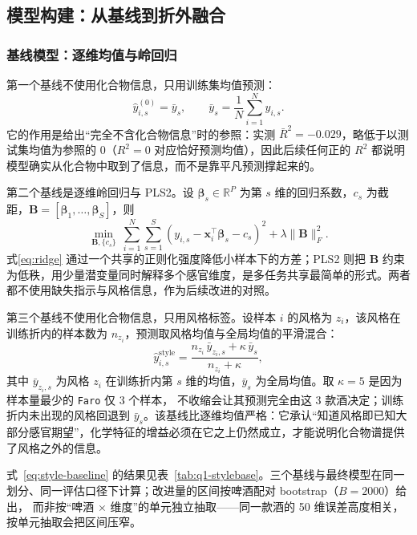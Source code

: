 ﻿\documentclass[UTF8,a4paper,zihao=-4]{ctexart}
\numberwithin{figure}{section}
\numberwithin{table}{section}
\numberwithin{equation}{section}
\newcommand{\file}[1]{\texttt{#1}}
\newcommand{\R}{\mathbb{R}}
\newcommand{\vx}{\bm{x}}
\newcommand{\bB}{\bm{B}}
\newcommand{\bbeta}{\bm{\beta}}
\begin{document}
\subsection{模型构建：从基线到折外融合}

\subsubsection{基线模型：逐维均值与岭回归}

第一个基线不使用化合物信息，只用训练集均值预测：
\begin{equation}
\hat y^{(0)}_{i,s}=\bar y_s,\qquad \bar y_s=\frac{1}{N}\sum_{i=1}^{N}y_{i,s}.
\label{eq:mean-baseline}
\end{equation}
它的作用是给出“完全不含化合物信息”时的参照：实测 $\bar R^2=-0.029$，略低于以测试集均值为参照的 0（$R^2=0$ 对应恰好预测均值），因此后续任何正的 $R^2$ 都说明模型确实从化合物中取到了信息，而不是靠平凡预测撑起来的。

第二个基线是逐维岭回归与 PLS2\cite{hastie2009,wold2001}。设 $\bbeta_s\in\R^{P}$ 为第 $s$ 维的回归系数，$c_s$ 为截距，$\bB=[\bbeta_1,\dots,\bbeta_S]$，则
\begin{equation}
\min_{\bB,\{c_s\}}\ \sum_{i=1}^{N}\sum_{s=1}^{S}\left(y_{i,s}-\vx_i^{\top}\bbeta_s-c_s\right)^2+\lambda\|\bB\|_F^2 .
\label{eq:ridge}
\end{equation}
式\eqref{eq:ridge} 通过一个共享的正则化强度降低小样本下的方差；PLS2 则把 $\bB$ 约束为低秩，用少量潜变量同时解释多个感官维度，是多任务共享最简单的形式。两者都不使用缺失指示与风格信息，作为后续改进的对照。

第三个基线不使用化合物信息，只用风格标签。设样本 $i$ 的风格为 $z_i$，该风格在训练折内的样本数为 $n_{z_i}$，预测取风格均值与全局均值的平滑混合：
\begin{equation}
\hat y^{\mathrm{style}}_{i,s}=\frac{n_{z_i}\,\bar y_{z_i,s}+\kappa\,\bar y_s}{n_{z_i}+\kappa},
\label{eq:style-baseline}
\end{equation}
其中 $\bar y_{z_i,s}$ 为风格 $z_i$ 在训练折内第 $s$ 维的均值，$\bar y_s$ 为全局均值。取 $\kappa=5$ 是因为样本量最少的 \file{Faro} 仅 3 个样本，
不收缩会让其预测完全由这 3 款酒决定；训练折内未出现的风格回退到 $\bar y_s$。该基线比逐维均值严格：它承认“知道风格即已知大部分感官期望”，化学特征的增益必须在它之上仍然成立，才能说明化合物谱提供了风格之外的信息。

式~\eqref{eq:style-baseline} 的结果见表~\ref{tab:q1-stylebase}。三个基线与最终模型在同一划分、同一评估口径下计算；改进量的区间按啤酒配对 bootstrap（$B=2000$）给出，
而非按“啤酒 $\times$ 维度”的单元独立抽取——同一款酒的 50 维误差高度相关，按单元抽取会把区间压窄。
\end{document}
